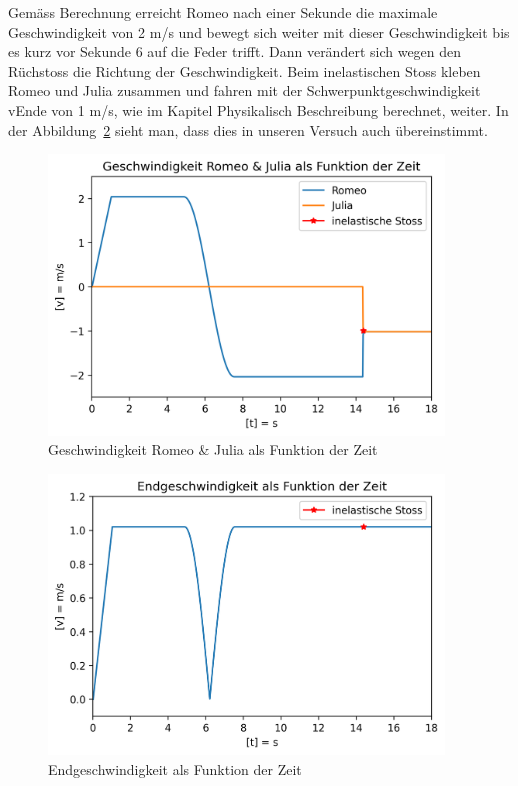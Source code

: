 \documentclass[../main.tex]{subfiles}
\begin{document}
    Gemäss Berechnung erreicht Romeo nach einer Sekunde die maximale Geschwindigkeit von 2 m/s und bewegt sich weiter mit dieser Geschwindigkeit bis es kurz vor Sekunde 6 auf die Feder trifft. Dann verändert sich wegen den Rüchstoss die Richtung der Geschwindigkeit. Beim inelastischen Stoss kleben Romeo und Julia zusammen und fahren mit der Schwerpunktgeschwindigkeit vEnde von 1 m/s, wie im Kapitel Physikalisch Beschreibung berechnet, weiter. In der Abbildung~\ref{fig:Endgeschwindigkeit} sieht man, dass dies in unseren Versuch auch übereinstimmt.
    \begin{figure}[H]
        \begin{center}
            \centerline{\includegraphics[width=105mm]{./images/Inelastisch/GeschwindigkeitRomeoJulia}}
            \caption{Geschwindigkeit Romeo \& Julia als Funktion der Zeit}
            \label{fig:GeschwindigkeitRomeoJulia}
        \end{center}
    \end{figure}

    \begin{figure}[H]
        \begin{center}
            \centerline{\includegraphics[width=105mm]{./images/Inelastisch/Endgeschwindigkeit}}
            \caption{Endgeschwindigkeit als Funktion der Zeit}
            \label{fig:Endgeschwindigkeit}
        \end{center}
    \end{figure}
\end{document}
